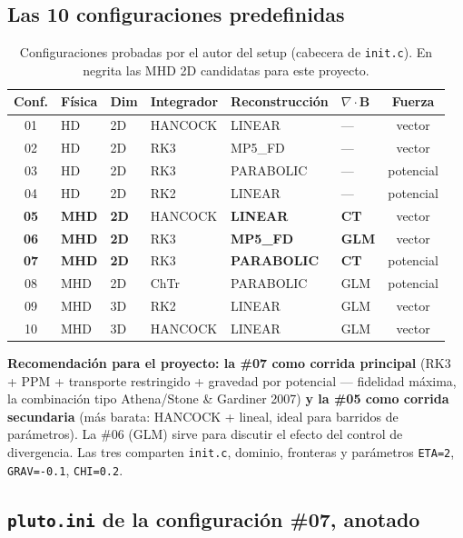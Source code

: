 \documentclass[11pt,a4paper]{article}
\newcommand{\B}{\mathbf{B}}
\newcommand{\code}[1]{\texttt{#1}}
\begin{document}
\subsection{Las 10 configuraciones predefinidas}

\begin{table}[htbp]
\centering\small
\caption{Configuraciones probadas por el autor del setup (cabecera de \code{init.c}).
En negrita las MHD 2D candidatas para este proyecto.}
\begin{tabular}{@{}clllllc@{}}
\toprule
Conf. & Física & Dim & Integrador & Reconstrucción & $\nabla\cdot\B$ & Fuerza \\
\midrule
01 & HD  & 2D & HANCOCK & LINEAR   & --- & vector \\
02 & HD  & 2D & RK3     & MP5\_FD  & --- & vector \\
03 & HD  & 2D & RK3     & PARABOLIC& --- & potencial \\
04 & HD  & 2D & RK2     & LINEAR   & --- & potencial \\
\textbf{05} & \textbf{MHD} & \textbf{2D} & HANCOCK & \textbf{LINEAR}    & \textbf{CT}  & vector \\
\textbf{06} & \textbf{MHD} & \textbf{2D} & RK3     & \textbf{MP5\_FD}   & \textbf{GLM} & vector \\
\textbf{07} & \textbf{MHD} & \textbf{2D} & RK3     & \textbf{PARABOLIC} & \textbf{CT}  & potencial \\
08 & MHD & 2D & ChTr    & PARABOLIC& GLM & potencial \\
09 & MHD & 3D & RK2     & LINEAR   & GLM & vector \\
10 & MHD & 3D & HANCOCK & LINEAR   & GLM & vector \\
\bottomrule
\end{tabular}
\end{table}

\textbf{Recomendación para el proyecto: la \#07 como corrida principal}
(RK3 + PPM + transporte restringido + gravedad por potencial --- fidelidad máxima, la
combinación tipo Athena/Stone \& Gardiner 2007) \textbf{y la \#05 como corrida secundaria}
(más barata: HANCOCK + lineal, ideal para barridos de parámetros). La \#06 (GLM) sirve para
discutir el efecto del control de divergencia. Las tres comparten \code{init.c}, dominio,
fronteras y parámetros \code{ETA=2}, \code{GRAV=-0.1}, \code{CHI=0.2}.

\subsection{\texttt{pluto.ini} de la configuración \#07, anotado}
\end{document}
